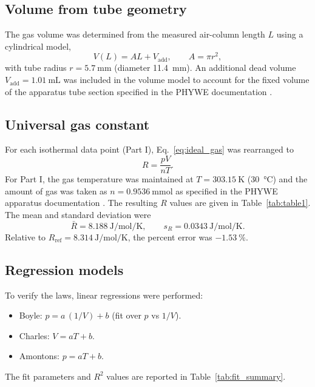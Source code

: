 \documentclass[journal]{IEEEtran}
\begin{document}
\subsection{Volume from tube geometry}
The gas volume was determined from the measured air-column length $L$ using a cylindrical model,
\begin{equation}
	V(L) = A L + V_{\mathrm{add}},\qquad A=\pi r^2,
	\label{eq:volume_geom}
\end{equation}
with tube radius $r=\SI{5.7}{\milli\meter}$ (diameter \SI{11.4}{\milli\meter}). An additional dead volume $V_{\mathrm{add}}=\SI{1.01}{\milli\liter}$ was included in the volume model to account for the fixed volume of the apparatus tube section specified in the PHYWE documentation \cite{phywe_manual}.

\subsection{Universal gas constant}
For each isothermal data point (Part I), Eq.~\eqref{eq:ideal_gas} was rearranged to
\begin{equation}
	R = \frac{pV}{nT}.
	\label{eq:R_calc}
\end{equation}
For Part I, the gas temperature was maintained at $T=\SI{303.15}{\kelvin}$ (\SI{30}{\celsius}) and the amount of gas was taken as $n=\SI{0.9536}{\milli\mole}$ as specified in the PHYWE apparatus documentation \cite{phywe_manual}. The resulting $R$ values are given in Table~\ref{tab:table1}. The mean and standard deviation were
\begin{equation}
	\bar{R} = \SI{8.188}{\joule\per\mole\per\kelvin},\qquad s_R=\SI{0.0343}{\joule\per\mole\per\kelvin}.
	\label{eq:R_mean_std}
\end{equation}
Relative to $R_{\mathrm{ref}}=\SI{8.314}{\joule\per\mole\per\kelvin}$, the percent error was $\SI{-1.53}{\percent}$.

\subsection{Regression models}
To verify the laws, linear regressions were performed:
\begin{itemize}
	\item Boyle: $p = a\,(1/V)+b$ (fit over $p$ vs $1/V$).
	\item Charles: $V = aT+b$.
	\item Amontons: $p = aT+b$.
\end{itemize}
The fit parameters and $R^2$ values are reported in Table~\ref{tab:fit_summary}.
\end{document}
